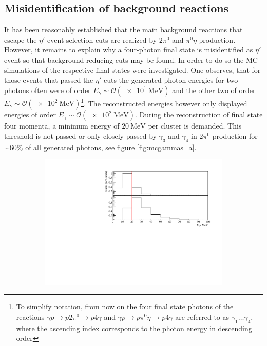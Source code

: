 \subsection{Misidentification of background reactions}
It has been reasonably established that the main background reactions that escape the $\eta'$ event selection cuts are realized by $2\pi^0$ and $\pi^0\eta$ production. However, it remains to explain why a four-photon final state is misidentified as $\eta'$ event so that background reducing cuts may be found. In order to do so the MC simulations of the respective final states were investigated. One observes, that for those events that passed the $\eta'$ cuts the generated photon energies for two photons often were of order $E_{\gamma} \sim \mathcal{O}(\SI{e1}{\mega\eV})$ and the other two of order $E_{\gamma} \sim \mathcal{O}(\SI{e2}{\mega\eV})$\footnote{To simplify notation, from now on the four final state photons of the reactions $\gamma p \to p2\pi^0\to p4\gamma$ and $\gamma p \to p\pi^0\eta\to p 4\gamma$ are referred to as $\gamma_1\dots\gamma_4$, where the ascending index corresponds to the photon energy in descending order}. The reconstructed energies however only displayed energies of order $E_{\gamma} \sim \mathcal{O}(\SI{e2}{\mega\eV})$.  During the reconstruction of final state four momenta, a minimum energy of $\SI{20}{\mega\eV}$ per cluster is demanded. This threshold is not passed or only closely passed by $\gamma_3$ and $\gamma_4$ in $2\pi^0$ production for $\sim 60\%$ of all generated photons, see figure \ref{fig:mcgammas_a}.\begin{figure}[htbp]
	\centering
	\begin{subfigure}{\linewidth}
		\includegraphics[width=\linewidth]{../figs/hydrogen/mcgammas.pdf}

\end{subfigure}
\end{figure}
